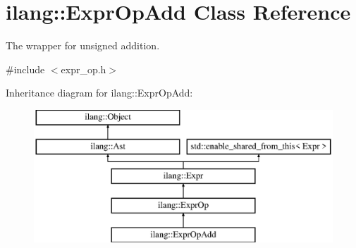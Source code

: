 \hypertarget{classilang_1_1_expr_op_add}{}\section{ilang\+:\+:Expr\+Op\+Add Class Reference}
\label{classilang_1_1_expr_op_add}


The wrapper for unsigned addition.  




{\ttfamily \#include $<$expr\+\_\+op.\+h$>$}

Inheritance diagram for ilang\+:\+:Expr\+Op\+Add\+:\begin{figure}[H]
\begin{center}
\leavevmode
\includegraphics[height=5.000000cm]{classilang_1_1_expr_op_add}
\end{center}
\end{figure}
